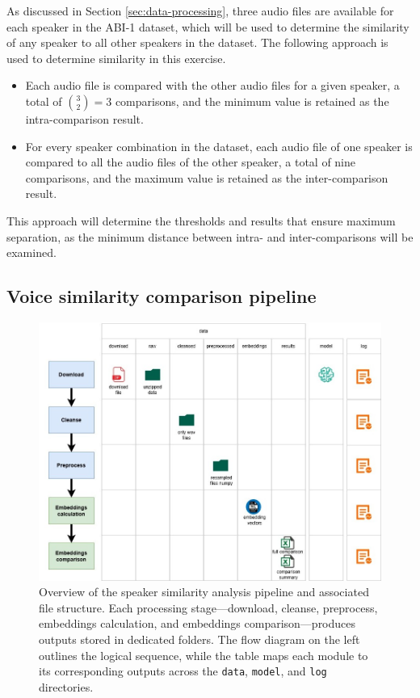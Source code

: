 \documentclass[conference]{IEEEtran}
\begin{document}
	As discussed in Section \ref{sec:data-processing}, three audio files are available for each speaker in the ABI-1 dataset, which will be used to determine the similarity of any speaker to all other speakers in the dataset. The following approach is used to determine similarity in this exercise.
	\begin{itemize}
		\item Each audio file is compared with the other audio files for a given speaker, a total of $\binom{3}{2} = 3$ comparisons, and the minimum value is retained as the intra-comparison result.
		\item For every speaker combination in the dataset, each audio file of one speaker is compared to all the audio files of the other speaker, a total of nine comparisons, and the maximum value is retained as the inter-comparison result.
	\end{itemize}
	
	This approach will determine the thresholds and results that ensure maximum separation, as the minimum distance between intra- and inter-comparisons will be examined.
	
	\subsection{Voice similarity comparison pipeline}
	
	\begin{figure}[H]
		\centering
		\includegraphics[width=1\linewidth]{img/img-pipeline}
		\caption{Overview of the speaker similarity analysis pipeline and associated file structure. Each processing stage—download, cleanse, preprocess, embeddings calculation, and embeddings comparison—produces outputs stored in dedicated folders. The flow diagram on the left outlines the logical sequence, while the table maps each module to its corresponding outputs across the \texttt{data}, \texttt{model}, and \texttt{log} directories.}	
		\label{fig:img-pipeline}
	\end{figure}
	
\end{document}
